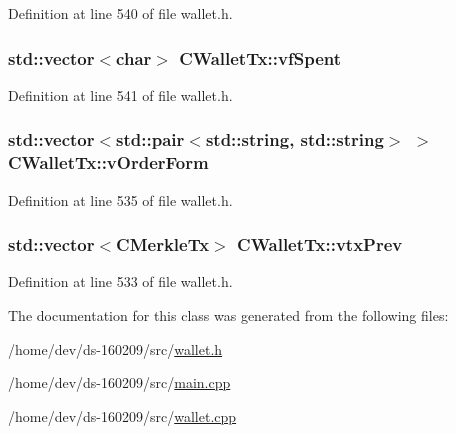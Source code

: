Definition at line 540 of file wallet.\+h.

\hypertarget{class_c_wallet_tx_a32c09e049302518c81f80c4f1f85583b}{}
\subsubsection[{vf\+Spent}]{\setlength{\rightskip}{0pt plus 5cm}std\+::vector$<$char$>$ C\+Wallet\+Tx\+::vf\+Spent}\label{class_c_wallet_tx_a32c09e049302518c81f80c4f1f85583b}


Definition at line 541 of file wallet.\+h.

\hypertarget{class_c_wallet_tx_a923dbbba343b8f4d1c3d89ae73bdcea0}{}
\subsubsection[{v\+Order\+Form}]{\setlength{\rightskip}{0pt plus 5cm}std\+::vector$<$std\+::pair$<$std\+::string, std\+::string$>$ $>$ C\+Wallet\+Tx\+::v\+Order\+Form}\label{class_c_wallet_tx_a923dbbba343b8f4d1c3d89ae73bdcea0}


Definition at line 535 of file wallet.\+h.

\hypertarget{class_c_wallet_tx_ae122d2e0ce296bd9dfc63eb3ede5ce98}{}
\subsubsection[{vtx\+Prev}]{\setlength{\rightskip}{0pt plus 5cm}std\+::vector$<${\bf C\+Merkle\+Tx}$>$ C\+Wallet\+Tx\+::vtx\+Prev}\label{class_c_wallet_tx_ae122d2e0ce296bd9dfc63eb3ede5ce98}


Definition at line 533 of file wallet.\+h.



The documentation for this class was generated from the following files\+:\begin{DoxyCompactItemize}
\item 
/home/dev/ds-\/160209/src/\hyperlink{wallet_8h}{wallet.\+h}\item 
/home/dev/ds-\/160209/src/\hyperlink{main_8cpp}{main.\+cpp}\item 
/home/dev/ds-\/160209/src/\hyperlink{wallet_8cpp}{wallet.\+cpp}\end{DoxyCompactItemize}
